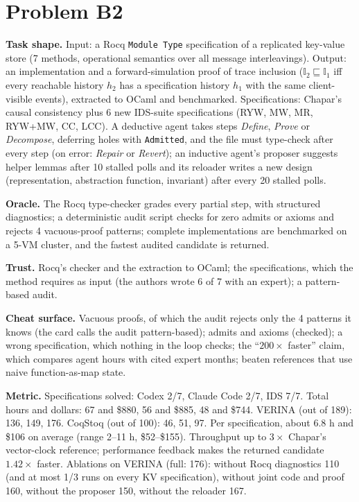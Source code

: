 \documentclass[11pt]{article}
\begin{document}
\section*{Problem B2}\label{ans:B2}
\begin{answer}
\textbf{Task shape.} Input: a Rocq \texttt{Module Type} specification of a
replicated key-value store (7 methods, operational semantics over all message
interleavings). Output: an implementation and a forward-simulation proof of
trace inclusion ($\mathbb{I}_2 \sqsubseteq \mathbb{I}_1$ iff every reachable
history $h_2$ has a specification history $h_1$ with the same client-visible
events), extracted to OCaml and benchmarked. Specifications: Chapar's causal
consistency plus 6 new IDS-suite specifications (RYW, MW, MR, RYW+MW, CC,
LCC). A deductive agent takes steps \emph{Define}, \emph{Prove} or
\emph{Decompose}, deferring holes with \texttt{Admitted}, and the file must
type-check after every step (on error: \emph{Repair} or \emph{Revert}); an
inductive agent's proposer suggests helper lemmas after 10 stalled polls and its
reloader writes a new design (representation, abstraction function, invariant)
after every 20 stalled polls.

\textbf{Oracle.} The Rocq type-checker grades every partial step, with
structured diagnostics; a deterministic audit script checks for zero admits or
axioms and rejects 4 vacuous-proof patterns; complete implementations are
benchmarked on a 5-VM cluster, and the fastest audited candidate is returned.

\textbf{Trust.} Rocq's checker and the extraction to OCaml; the specifications,
which the method requires as input (the authors wrote 6 of 7 with an expert);
a pattern-based audit.

\textbf{Cheat surface.} Vacuous proofs, of which the audit rejects only the 4
patterns it knows (the card calls the audit pattern-based); admits and axioms
(checked); a wrong specification, which nothing in the loop checks; the
``$200\times$ faster'' claim, which compares agent hours with cited expert
months; beaten references that use naive function-as-map state.

\textbf{Metric.} Specifications solved: Codex 2/7, Claude Code 2/7, IDS 7/7.
Total hours and dollars: 67 and \$880, 56 and \$885, 48 and \$744. VERINA (out
of 189): 136, 149, 176. CoqStoq (out of 100): 46, 51, 97. Per specification,
about 6.8 h and \$106 on average (range 2--11 h, \$52--\$155). Throughput up to
$3\times$ Chapar's vector-clock reference; performance feedback makes the
returned candidate $1.42\times$ faster. Ablations on VERINA (full: 176):
without Rocq diagnostics 110 (and at most 1/3 runs on every KV specification),
without joint code and proof 160, without the proposer 150, without the
reloader 167.


\end{answer}
\end{document}
